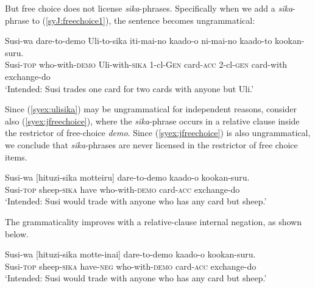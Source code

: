 \documentclass[output=paper,colorlinks,citecolor=brown,
]{langscibook}
\def\M#1{\textsc{#1}}
\begin{document}
But free choice does not license \emph{sika}-phrases. Specifically when we add a \emph{sika}-phrase to (\ref{syJ:freechoice1}), the sentence becomes ungrammatical:

\ea \label{syex:ulisika}
\gll *Susi-wa dare-to-demo Uli-to-sika iti-mai-no kaado-o ni-mai-no kaado-to kookan-suru.\\
Susi-\M{top} who-with-\M{demo} Uli-with-\M{sika} 1-cl-\M{Gen} card-\M{acc} 2-cl-\M{gen} card-with exchange-do\\
\glt `Intended: Susi trades one card for two cards with anyone but Uli.'\z

Since (\ref{syex:ulisika}) may be ungrammatical for independent  reasons, consider also (\ref{syex:jfreechoice}), where the \emph{sika}-phrase  occurs in a relative clause inside the restrictor of free-choice \emph{demo}.
Since (\ref{syex:jfreechoice}) is also ungrammatical, we conclude that \emph{sika}-phrases are never licensed in the restrictor of free choice items.


\ea \label{syex:jfreechoice}
\gll *Susi-wa [hituzi-sika motteiru] dare-to-demo kaado-o kookan-suru.\\
Susi-\M{top} sheep-\M{sika} have who-with-\M{demo} card-\M{acc} exchange-do\\
\glt `Intended: Susi would trade with anyone who has any card but sheep.'\z

The grammaticality improves with a relative-clause internal negation, as shown below.

\ea 
\gll Susi-wa [hituzi-sika motte-inai] dare-to-demo kaado-o kookan-suru.\\
Susi-\M{top} sheep-\M{sika} have-\M{neg} who-with-\M{demo} card-\M{acc} exchange-do\\
\glt `Intended: Susi would trade with anyone who has any card but sheep.'\z







\end{document}
